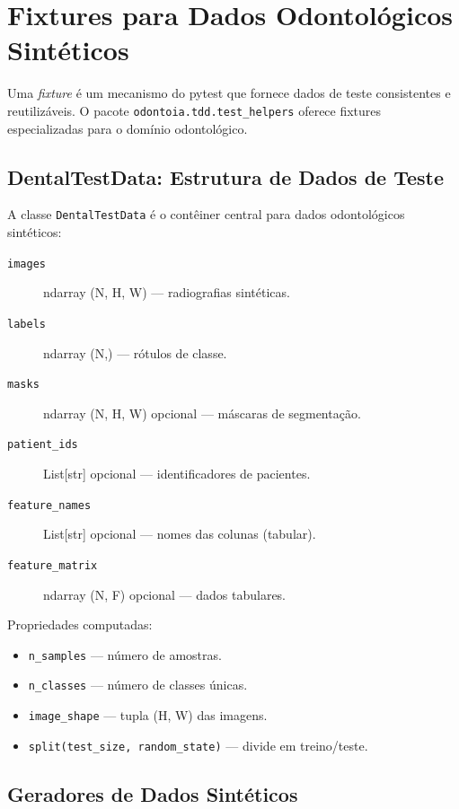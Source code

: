 
\section{Fixtures para Dados Odontológicos Sintéticos}

Uma \textit{fixture} é um mecanismo do pytest que fornece dados de teste
consistentes e reutilizáveis. O pacote \texttt{odontoia.tdd.test\_helpers}
oferece fixtures especializadas para o domínio odontológico.

\subsection{DentalTestData: Estrutura de Dados de Teste}

A classe \texttt{DentalTestData} é o contêiner central para dados
odontológicos sintéticos:

\begin{description}
  \item[\texttt{images}] ndarray (N, H, W) — radiografias sintéticas.
  \item[\texttt{labels}] ndarray (N,) — rótulos de classe.
  \item[\texttt{masks}] ndarray (N, H, W) opcional — máscaras de segmentação.
  \item[\texttt{patient\_ids}] List[str] opcional — identificadores de pacientes.
  \item[\texttt{feature\_names}] List[str] opcional — nomes das colunas (tabular).
  \item[\texttt{feature\_matrix}] ndarray (N, F) opcional — dados tabulares.
\end{description}

Propriedades computadas:
\begin{itemize}
  \item \texttt{n\_samples} — número de amostras.
  \item \texttt{n\_classes} — número de classes únicas.
  \item \texttt{image\_shape} — tupla (H, W) das imagens.
  \item \texttt{split(test\_size, random\_state)} — divide em treino/teste.
\end{itemize}

\subsection{Geradores de Dados Sintéticos}

